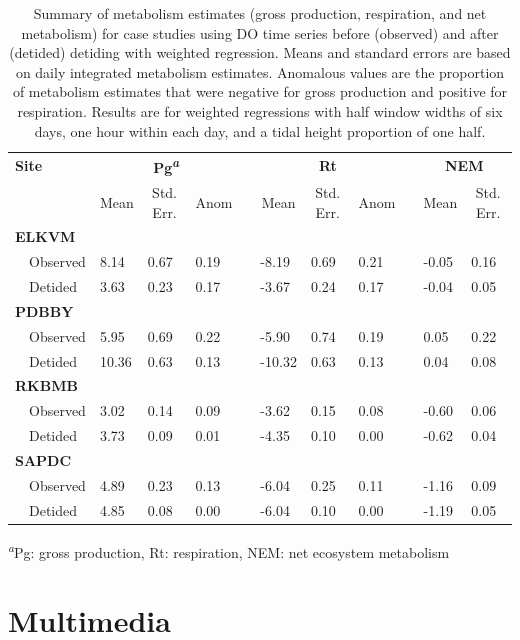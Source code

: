 \documentclass[letterpaper,12pt,oneside]{article}\usepackage[]{graphicx}\usepackage[]{color}
\begin{document}
%
\begin{table}[!tbp]
\caption{Summary of metabolism estimates (gross production, respiration, and net metabolism) for case studies using \ac{DO} time series before (observed) and after (detided) detiding with weighted regression.  Means and standard errors are based on daily integrated metabolism estimates.  Anomalous values are the proportion of metabolism estimates that were negative for gross production and positive for respiration.  Results are for weighted regressions with half window widths of six days, one hour within each day, and a tidal height proportion of one half.\label{tab:case_res}} 
\begin{center}
\begin{tabular}{llllclllcll}
\hline\hline
\multicolumn{1}{l}{\bfseries Site}&\multicolumn{3}{c}{\bfseries Pg\textsuperscript{\textit{a}}}&\multicolumn{1}{c}{\bfseries }&\multicolumn{3}{c}{\bfseries Rt}&\multicolumn{1}{c}{\bfseries }&\multicolumn{2}{c}{\bfseries NEM}\tabularnewline
\cline{2-4} \cline{6-8} \cline{10-11}
\multicolumn{1}{l}{}&\multicolumn{1}{c}{Mean}&\multicolumn{1}{c}{Std. Err.}&\multicolumn{1}{c}{Anom}&\multicolumn{1}{c}{}&\multicolumn{1}{c}{Mean}&\multicolumn{1}{c}{Std. Err.}&\multicolumn{1}{c}{Anom}&\multicolumn{1}{c}{}&\multicolumn{1}{c}{Mean}&\multicolumn{1}{c}{Std. Err.}\tabularnewline
\hline
{\bfseries ELKVM}&&&&&&&&&&\tabularnewline
~~Observed& 8.14&0.67&0.19&& -8.19&0.69&0.21&&-0.05&0.16\tabularnewline
~~Detided& 3.63&0.23&0.17&& -3.67&0.24&0.17&&-0.04&0.05\tabularnewline
\hline
{\bfseries PDBBY}&&&&&&&&&&\tabularnewline
~~Observed& 5.95&0.69&0.22&& -5.90&0.74&0.19&& 0.05&0.22\tabularnewline
~~Detided&10.36&0.63&0.13&&-10.32&0.63&0.13&& 0.04&0.08\tabularnewline
\hline
{\bfseries RKBMB}&&&&&&&&&&\tabularnewline
~~Observed& 3.02&0.14&0.09&& -3.62&0.15&0.08&&-0.60&0.06\tabularnewline
~~Detided& 3.73&0.09&0.01&& -4.35&0.10&0.00&&-0.62&0.04\tabularnewline
\hline
{\bfseries SAPDC}&&&&&&&&&&\tabularnewline
~~Observed& 4.89&0.23&0.13&& -6.04&0.25&0.11&&-1.16&0.09\tabularnewline
~~Detided& 4.85&0.08&0.00&& -6.04&0.10&0.00&&-1.19&0.05\tabularnewline
\hline
\end{tabular}
\end{center}
\textsuperscript{\textit{a}}Pg: gross production, Rt: respiration, NEM: net ecosystem metabolism\end{table}


\clearpage


\raggedbottom
\raggedright
\setlength{\parindent}{0.5in}

\section{Multimedia} \label{multi}

\end{document}
